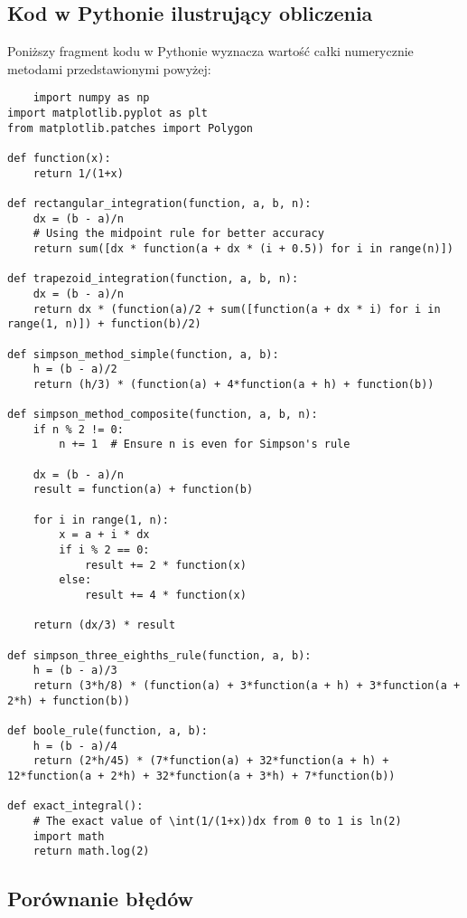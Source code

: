 \documentclass[a4paper,12pt]{article}
\begin{document}
\newpage
\subsection*{Kod w Pythonie ilustrujący obliczenia}
Poniższy fragment kodu w Pythonie wyznacza wartość całki numerycznie metodami przedstawionymi powyżej:
\begin{lstlisting}
    import numpy as np
import matplotlib.pyplot as plt
from matplotlib.patches import Polygon

def function(x):
    return 1/(1+x)

def rectangular_integration(function, a, b, n):
    dx = (b - a)/n
    # Using the midpoint rule for better accuracy
    return sum([dx * function(a + dx * (i + 0.5)) for i in range(n)])

def trapezoid_integration(function, a, b, n):
    dx = (b - a)/n
    return dx * (function(a)/2 + sum([function(a + dx * i) for i in range(1, n)]) + function(b)/2)

def simpson_method_simple(function, a, b):
    h = (b - a)/2
    return (h/3) * (function(a) + 4*function(a + h) + function(b))

def simpson_method_composite(function, a, b, n):
    if n % 2 != 0:
        n += 1  # Ensure n is even for Simpson's rule
    
    dx = (b - a)/n
    result = function(a) + function(b)
    
    for i in range(1, n):
        x = a + i * dx
        if i % 2 == 0:
            result += 2 * function(x)
        else:
            result += 4 * function(x)
            
    return (dx/3) * result

def simpson_three_eighths_rule(function, a, b):
    h = (b - a)/3
    return (3*h/8) * (function(a) + 3*function(a + h) + 3*function(a + 2*h) + function(b))

def boole_rule(function, a, b):
    h = (b - a)/4
    return (2*h/45) * (7*function(a) + 32*function(a + h) + 12*function(a + 2*h) + 32*function(a + 3*h) + 7*function(b))

def exact_integral():
    # The exact value of \int(1/(1+x))dx from 0 to 1 is ln(2)
    import math
    return math.log(2)
\end{lstlisting}
\newpage

\subsection*{Porównanie błędów}
\end{document}
